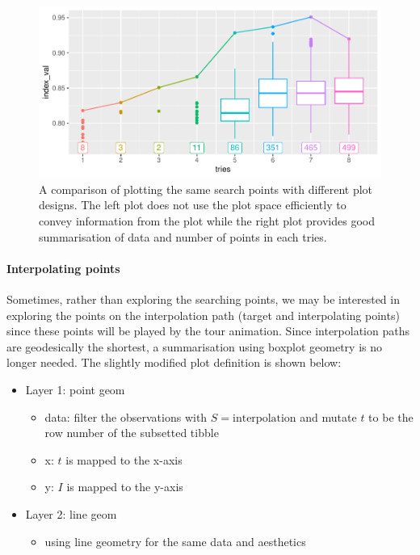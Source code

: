 \documentclass[12pt]{article}
\providecommand{\tightlist}{%
  \setlength{\itemsep}{0pt}\setlength{\parskip}{0pt}}
\begin{document}
\begin{figure}
\centering
\includegraphics{paper_files/figure-latex/points-tries-1.pdf}
\caption{\label{points}A comparison of plotting the same search points
with different plot designs. The left plot does not use the plot space
efficiently to convey information from the plot while the right plot
provides good summarisation of data and number of points in each tries.}
\end{figure}

\hypertarget{interpolating-points}{%
\paragraph{Interpolating points}\label{interpolating-points}}

Sometimes, rather than exploring the searching points, we may be
interested in exploring the points on the interpolation path (target and
interpolating points) since these points will be played by the tour
animation. Since interpolation paths are geodesically the shortest, a
summarisation using boxplot geometry is no longer needed. The slightly
modified plot definition is shown below:

\begin{itemize}
\tightlist
\item
  Layer 1: point geom

  \begin{itemize}
  \tightlist
  \item
    data: filter the observations with \(S = \text{interpolation}\) and
    mutate \(t\) to be the row number of the subsetted tibble
  \item
    x: \(t\) is mapped to the x-axis
  \item
    y: \(I\) is mapped to the y-axis
  \end{itemize}
\item
  Layer 2: line geom

  \begin{itemize}
  \tightlist
  \item
    using line geometry for the same data and aesthetics
  \end{itemize}
\end{itemize}
\end{document}
